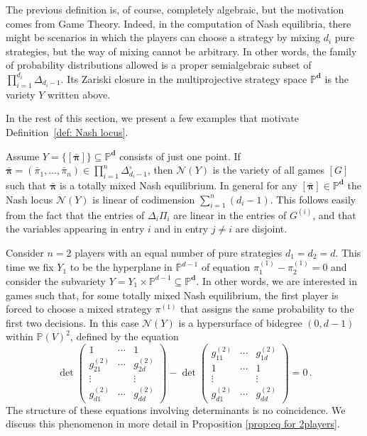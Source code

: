 \documentclass[12pt]{article}
\theoremstyle{definition}
\newenvironment{example}
{\pushQED{\qed}\renewcommand{\qedsymbol}{$\diamond$}\examplex}
{\popQED\endexamplex}
\newcommand{\PP}{{\mathbb P}}
\def\bd{{\boldsymbol{d}}}
\def\bpi{{\boldsymbol{\pi}}}
\newcommand{\kn}{{\mathcal N}}
\begin{document}
The previous definition is, of course, completely algebraic, but the motivation comes from Game Theory. Indeed, in the computation of Nash equilibria, there might be scenarios in which the players can choose a strategy by mixing $d_i$ pure strategies, but the way of mixing cannot be arbitrary. In other words, the family of probability distributions allowed is a proper semialgebraic subset of $\prod_{i=1}^{d_i} \Delta_{d_i-1}$. Its Zariski closure in the multiprojective strategy space $\PP^\bd$ is the variety $Y$ written above.

\medskip

In the rest of this section, we present a few examples that motivate Definition~\ref{def: Nash locus}.

\begin{example}\label{ex: really one point}
Assume $Y=\{[\bar{\bpi}]\}\subseteq \PP^\bd$ consists of just one point. If $\bar{\bpi}=(\bar{\pi}_1,\ldots,\bar{\pi}_n)\in\prod_{i=1}^n\Delta_{d_i-1}^\circ$, then $\kn(Y)$ is the variety of all games $[G]$ such that $\bar{\bpi}$ is a totally mixed Nash equilibrium. In general for any $[\bar{\bpi}]\in \PP^\bd$ the Nash locus $\kn(Y)$ is linear of codimension $\sum_{i=1}^n(d_i-1)$. This follows easily from the fact that the entries of $\Delta_i\Pi_i$ are linear in the entries of $G^{(i)}$, and that the variables appearing in entry $i$ and in entry $j\neq i$ are disjoint.
\end{example}

\begin{example}\label{ex: one hyperplane}
Consider $n=2$ players with an equal number of pure strategies $d_1=d_2=d$. This time we fix $Y_1$ to be the hyperplane in $\PP^{d-1}$ of equation $\pi_1^{(1)}-\pi_2^{(1)}=0$ and consider the subvariety $Y=Y_1\times\PP^{d-1}\subseteq\PP^\bd$.
In other words, we are interested in games such that, for some totally mixed Nash equilibrium, the first player is forced to choose a mixed strategy $\pi^{(1)}$ that assigns the same probability to the first two decisions.
In this case $\kn(Y)$ is a hypersurface of bidegree $(0,d-1)$ within $\PP(V)^2$, defined by the equation
\[
\det
\begin{pmatrix}
1 & \cdots & 1\\
g_{21}^{(2)} & \cdots & g_{2d}^{(2)}\\
\vdots & & \vdots\\
g_{d1}^{(2)} & \cdots & g_{dd}^{(2)}
\end{pmatrix}
-
\det
\begin{pmatrix}
g_{11}^{(2)} & \cdots & g_{1d}^{(2)}\\
1 & \cdots & 1\\
\vdots & & \vdots\\
g_{d1}^{(2)} & \cdots & g_{dd}^{(2)}
\end{pmatrix}
=0\,.
\]
The structure of these equations involving determinants is no coincidence. We discuss this phenomenon in more detail in Proposition \ref{prop:eq for 2players}.
\end{example}
\end{document}
